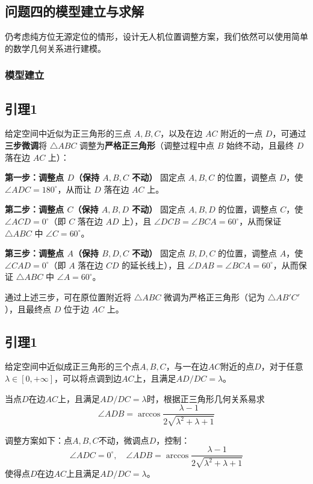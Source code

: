 \documentclass[withoutpreface,bwprint]{cumcmthesis} %
\begin{document}
\subsection{问题四的模型建立与求解}
仍考虑纯方位无源定位的情形，设计无人机位置调整方案，我们依然可以使用简单的数学几何关系进行建模。
\subsubsection{模型建立}
\subsection*{引理1}
给定空间中近似为正三角形的三点 \( A, B, C \)，以及在边 \( AC \) 附近的一点 \( D \)，可通过\textbf{三步微调}将 \( \triangle ABC \) 调整为\textbf{严格正三角形}（调整过程中点 \( B \) 始终不动，且最终 \( D \) 落在边 \( AC \) 上）：

\noindent \textbf{第一步：调整点 \( D \)（保持 \( A, B, C \) 不动）}
固定点 \( A, B, C \) 的位置，调整点 \( D \)，使 \( \angle ADC = 180^\circ \)，从而让 \( D \) 落在边 \( AC \) 上。

\noindent \textbf{第二步：调整点 \( C \)（保持 \( A, B, D \) 不动）}
固定点 \( A, B, D \) 的位置，调整点 \( C \)，使 \( \angle ACD = 0^\circ \)（即 \( C \) 落在边 \( AD \) 上），且 \( \angle DCB = \angle BCA = 60^\circ \)，从而保证 \( \triangle ABC \) 中 \( \angle C = 60^\circ \)。

\noindent \textbf{第三步：调整点 \( A \)（保持 \( B, D, C \) 不动）}
固定点 \( B, D, C \) 的位置，调整点 \( A \)，使 \( \angle CAD = 0^\circ \)（即 \( A \) 落在边 \( CD \) 的延长线上），且 \( \angle DAB = \angle BCA = 60^\circ \)，从而保证 \( \triangle ABC \) 中 \( \angle A = 60^\circ \)。

通过上述三步，可在原位置附近将 \( \triangle ABC \) 微调为严格正三角形（记为 \( \triangle AB'C' \)），且最终点 \( D \) 位于边 \( AC \) 上。
\subsection*{引理1}
给定空间中近似成正三角形的三个点\( A,B,C \)，与一在边\( AC \)附近的点\( D \)，对于任意\( \lambda \in [0, +\infty] \)，可以将点调到边\( AC \)上，且满足\( AD/DC = \lambda \)。

当点\( D \)在边\( AC \)上，且满足\( AD/DC = \lambda \)时，根据正三角形几何关系易求
\[
\angle ADB = \arccos \frac{\lambda - 1}{2\sqrt{\lambda^2 + \lambda + 1}}
\]

调整方案如下：点\( A,B,C \)不动，微调点\( D \)，控制：
\[
\angle ADC = 0^\circ, \quad \angle ADB = \arccos \frac{\lambda - 1}{2\sqrt{\lambda^2 + \lambda + 1}}
\]
使得点\( D \)在边\( AC \)上且满足\( AD/DC = \lambda \)。
\end{document}
